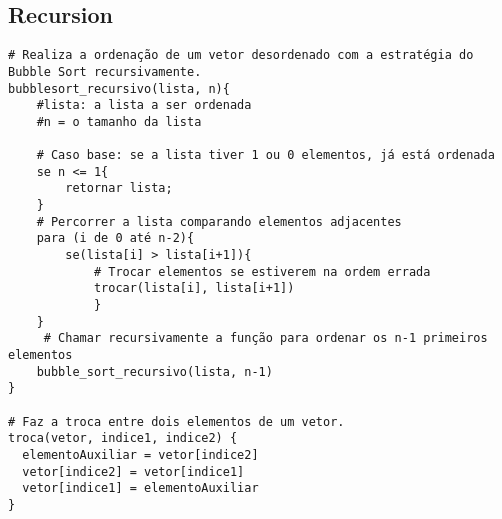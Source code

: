 \subsection{Recursion}
\begin{verbatim}
# Realiza a ordenação de um vetor desordenado com a estratégia do Bubble Sort recursivamente.
bubblesort_recursivo(lista, n){
    #lista: a lista a ser ordenada
    #n = o tamanho da lista

    # Caso base: se a lista tiver 1 ou 0 elementos, já está ordenada
    se n <= 1{
        retornar lista;
    }
    # Percorrer a lista comparando elementos adjacentes
    para (i de 0 até n-2){
        se(lista[i] > lista[i+1]){
            # Trocar elementos se estiverem na ordem errada
            trocar(lista[i], lista[i+1])
            }
    }
     # Chamar recursivamente a função para ordenar os n-1 primeiros elementos
    bubble_sort_recursivo(lista, n-1)
}    

# Faz a troca entre dois elementos de um vetor.
troca(vetor, indice1, indice2) { 
  elementoAuxiliar = vetor[indice2]
  vetor[indice2] = vetor[indice1]
  vetor[indice1] = elementoAuxiliar
}
\end{verbatim}